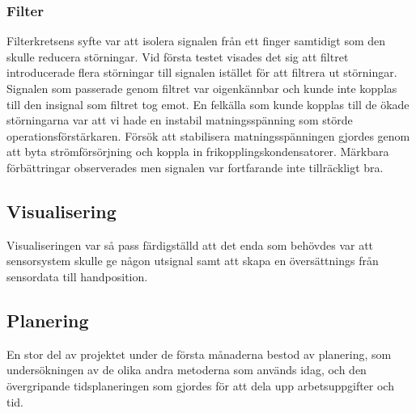 \documentclass[a4paper]{article}
\begin{document}
\begin{sloppypar}
    \subsubsection{Filter}
    Filterkretsens syfte var att isolera signalen från ett finger samtidigt som den skulle reducera störningar. Vid första testet
    visades det sig att filtret introducerade flera störningar till signalen istället för att filtrera ut störningar. Signalen
    som passerade genom filtret var oigenkännbar och kunde inte kopplas till den insignal som filtret tog emot. En felkälla som
    kunde kopplas till de ökade störningarna var att vi hade en instabil matningsspänning som störde operationsförstärkaren.
    Försök att stabilisera matningsspänningen gjordes genom att byta strömförsörjning och koppla in frikopplingskondensatorer.
    Märkbara förbättringar observerades men signalen var fortfarande inte tillräckligt bra.

    \subsection{Visualisering}
    Visualiseringen var så pass färdigställd att det enda som behövdes var att sensorsystem skulle ge någon utsignal samt att skapa en översättnings från sensordata till handposition.

    \subsection{Planering}
    En stor del av projektet under de första månaderna bestod av planering, som undersökningen av de olika andra metoderna som används idag, och den övergripande tidsplaneringen som gjordes för att dela upp arbetsuppgifter och tid.

\end{sloppypar}
\end{document}
